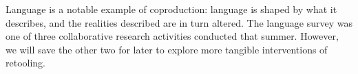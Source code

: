 




Language is a notable example of coproduction: language is shaped by what it describes, and the realities described are in turn altered. The language survey was one of three collaborative research activities conducted that summer. However, we will save the other two for later to explore more tangible interventions of retooling.


